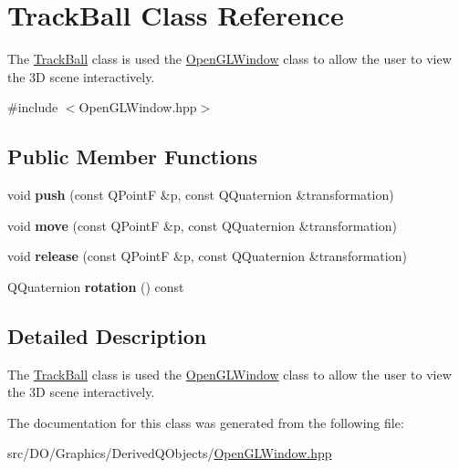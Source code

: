 \hypertarget{class_d_o_1_1_track_ball}{\section{Track\-Ball Class Reference}
\label{class_d_o_1_1_track_ball}
}


The \hyperlink{class_d_o_1_1_track_ball}{Track\-Ball} class is used the \hyperlink{class_d_o_1_1_open_g_l_window}{Open\-G\-L\-Window} class to allow the user to view the 3\-D scene interactively.  




{\ttfamily \#include $<$Open\-G\-L\-Window.\-hpp$>$}

\subsection*{Public Member Functions}
\begin{DoxyCompactItemize}
\item 
\hypertarget{class_d_o_1_1_track_ball_af48014ef141c7038209831db7ba1cb3c}{void {\bfseries push} (const Q\-Point\-F \&p, const Q\-Quaternion \&transformation)}\label{class_d_o_1_1_track_ball_af48014ef141c7038209831db7ba1cb3c}

\item 
\hypertarget{class_d_o_1_1_track_ball_a38def792dd690a4deb5d4dcd2900d8d4}{void {\bfseries move} (const Q\-Point\-F \&p, const Q\-Quaternion \&transformation)}\label{class_d_o_1_1_track_ball_a38def792dd690a4deb5d4dcd2900d8d4}

\item 
\hypertarget{class_d_o_1_1_track_ball_a7e815bb859d1468635bd6515581f083c}{void {\bfseries release} (const Q\-Point\-F \&p, const Q\-Quaternion \&transformation)}\label{class_d_o_1_1_track_ball_a7e815bb859d1468635bd6515581f083c}

\item 
\hypertarget{class_d_o_1_1_track_ball_aab269586dca28633e4a7adb4c580f00f}{Q\-Quaternion {\bfseries rotation} () const }\label{class_d_o_1_1_track_ball_aab269586dca28633e4a7adb4c580f00f}

\end{DoxyCompactItemize}


\subsection{Detailed Description}
The \hyperlink{class_d_o_1_1_track_ball}{Track\-Ball} class is used the \hyperlink{class_d_o_1_1_open_g_l_window}{Open\-G\-L\-Window} class to allow the user to view the 3\-D scene interactively. 

The documentation for this class was generated from the following file\-:\begin{DoxyCompactItemize}
\item 
src/\-D\-O/\-Graphics/\-Derived\-Q\-Objects/\hyperlink{_open_g_l_window_8hpp}{Open\-G\-L\-Window.\-hpp}\end{DoxyCompactItemize}

